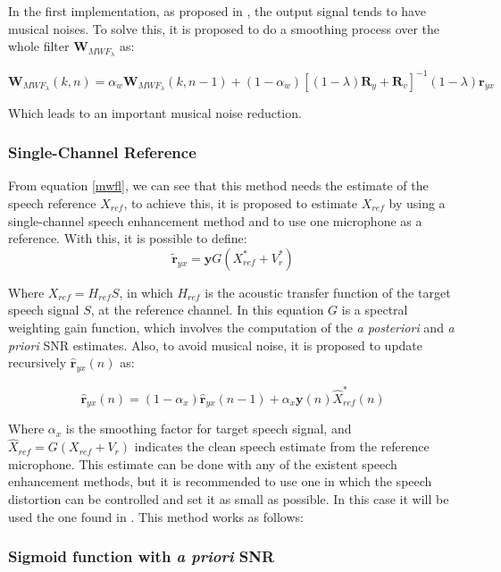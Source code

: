 In the first implementation, as proposed in \cite{Yong2013}, the output signal tends to have musical noises. To solve this, it is proposed to do a smoothing process over the whole filter $\textbf{W}_{MWF_\lambda}$ as:

\begin{equation}
 \textbf{W}_{MWF_\lambda}(k,n)= \alpha_w\textbf{W}_{MWF_\lambda}(k,n-1)+(1-\alpha_w) [(1-\lambda)\textbf{R}_y+\textbf{R}_v]^{-1}(1-\lambda)\textbf{r}_{yx}
\label{mwfeq}
\end{equation}


Which leads to an important musical noise reduction.

\subsubsection{Single-Channel Reference}

From equation \eqref{mwfl}, we can see that this method needs the estimate of the speech reference $X_{ref}$, to achieve this, it is proposed to estimate $X_{ref}$ by using a single-channel speech enhancement method and to use one microphone as a reference. With this, it is possible to define: $$\tilde{\textbf{r}}_{yx}=\textbf{y}G(X^*_{ref}+V^*_r)$$

Where $X_{ref}=H_{ref}S$, in which $H_{ref}$ is the acoustic transfer function of the target speech signal $S$, at the reference channel. In this equation $G$ is a spectral weighting gain function, which involves the computation of the \textit{a posteriori }and \textit{a priori} SNR estimates. Also, to avoid musical noise, it is proposed to update recursively $\hat{\textbf{r}}_{yx}(n)$ as:

\begin{equation}
\hat{\textbf{r}}_{yx}(n)=(1-\alpha_x)\hat{\textbf{r}}_{yx}(n-1)+\alpha_x\textbf{y}(n)\hat{X}^*_{ref}(n)
\label{requ}
\end{equation}


Where $\alpha_x$ is the smoothing  factor for target speech signal, and $\hat{X}_{ref} = G(X_{ref}+V_r)$  indicates the clean speech estimate from the reference microphone.  This estimate  can be done with any of the existent speech enhancement methods, but it is recommended to use one in which the  speech distortion can be controlled and set it as small as possible. In this case it will be used the one found in \cite{Yong2013OptimizationEnhancement}. This method works as follows:   

\subsubsection{Sigmoid function with \textit{a priori} SNR}



